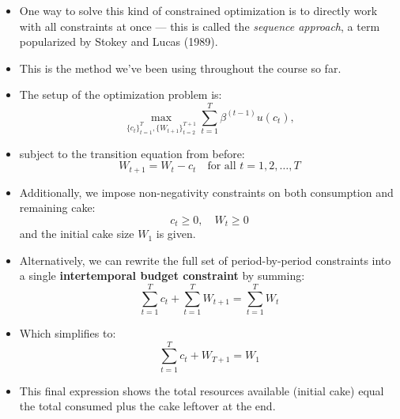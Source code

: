 \documentclass[12pt]{article}
\begin{document}
\begin{itemize}
    \item One way to solve this kind of constrained optimization is to directly work with all constraints at once — this is called the \textit{sequence approach}, a term popularized by Stokey and Lucas (1989).

    \item This is the method we’ve been using throughout the course so far.

    \item The setup of the optimization problem is:
    \[
    \max_{\{c_t\}_{t=1}^T, \{W_{t+1}\}_{t=2}^{T+1}} \sum_{t=1}^T \beta^{(t-1)} u(c_t), \tag{2}
    \]

    \item subject to the transition equation from before:
    \[
    W_{t+1} = W_t - c_t \quad \text{for all } t = 1, 2, \dots, T
    \]
    
    \item Additionally, we impose non-negativity constraints on both consumption and remaining cake:
    \[
    c_t \geq 0, \quad W_t \geq 0
    \]
    and the initial cake size \( W_1 \) is given.

    \item Alternatively, we can rewrite the full set of period-by-period constraints into a single \textbf{intertemporal budget constraint} by summing:
    \[
    \sum_{t=1}^T c_t + \sum_{t=1}^T W_{t+1} = \sum_{t=1}^T W_t
    \]

    \item Which simplifies to:
    \[
    \sum_{t=1}^T c_t + W_{T+1} = W_1 \tag{3}
    \]

    \item This final expression shows the total resources available (initial cake) equal the total consumed plus the cake leftover at the end.
\end{itemize}
\end{document}
